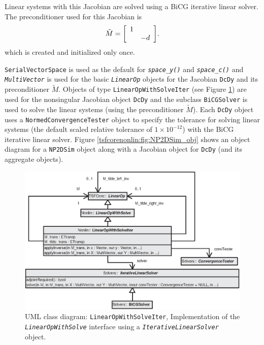 Linear systems with this Jacobian are solved using a BiCG iterative
linear solver.  The preconditioner used for this Jacobian is
%
\begin{equation}
\tilde{M} =
{\bmat{cc}
  1        &        \\
            &   -d
\emat}.
\end{equation}
%
which is created and initialized only once.

\texttt{Serial\-Vector\-Space} is used as the default
for \texttt{\textit{space\_y()}} and \texttt{\textit{space\_c()}} and
\texttt{\textit{Multi\-Vector}} is used for the basic
\texttt{\textit{LinearOp}} objects for the Jacobian \texttt{DcDy} and
its preconditioner $\tilde{M}$.  Objects of type
\texttt{Linear\-Op\-With\-Solve\-Iter} (see Figure
\ref{tsfcorenonlin:fig:LinearOpWithSolve}) are used for the
nonsingular Jacobian object \texttt{DcDy} and the subclass
\texttt{BiCG\-Solver} is used to solve the linear systems (using the
preconditioner $\tilde{M}$).  Each \texttt{DcDy} object uses a
\texttt{Normed\-Convergence\-Tester} object to specify the tolerance
for solving linear systems (the default scaled relative tolerance of
$1\times{}10^{-12}$) with the BiCG iterative linear solver.  Figure
\ref{tsfcorenonlin:fig:NP2DSim_obj} shows an object diagram for a
\texttt{NP2DSim} object along with a Jacobian object for
\texttt{DcDy} (and its aggregate objects).

%
{\bsinglespace
\begin{figure}
\begin{center}
\includegraphics*[bb= 0.0in 0.0in 5.7in 3.8in,angle=0,scale=0.70
]{LinearOpWithSolveIter}
\end{center}
\caption{
\label{tsfcorenonlin:fig:LinearOpWithSolve}
UML \cite{ref:booch_et_al_1999} class diagram:
\texttt{Linear\-Op\-With\-Solve\-Iter}, Implementation
of the \texttt{\textit{Linear\-Op\-With\-Solve}} interface using a
\texttt{\textit{Iterative\-Linear\-Solver}} object.
}
\end{figure}
\esinglespace}
%

